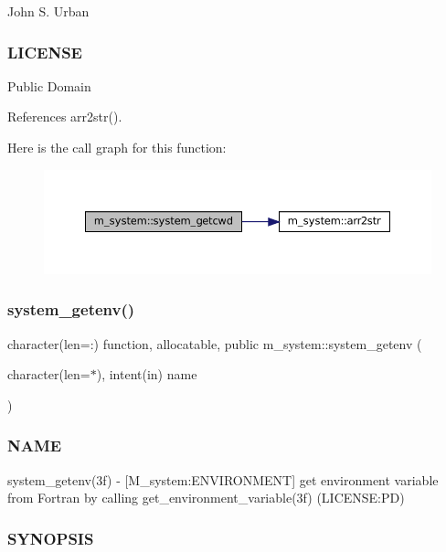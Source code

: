 John S. Urban \subsubsection*{L\+I\+C\+E\+N\+SE}

Public Domain 

References arr2str().

Here is the call graph for this function\+:
\nopagebreak
\begin{figure}[H]
\begin{center}
\leavevmode
\includegraphics[width=350pt]{namespacem__system_a5a32db818a9ffb0a4ea724e95356c560_cgraph}
\end{center}
\end{figure}
\mbox{\label{namespacem__system_a15f307db605f8b332d4213814c0fb1a9}} 
\subsubsection{\texorpdfstring{system\+\_\+getenv()}{system\_getenv()}}
{\footnotesize\ttfamily character(len=\+:) function, allocatable, public m\+\_\+system\+::system\+\_\+getenv (\begin{DoxyParamCaption}\item[{character(len=$\ast$), intent(in)}]{name }\end{DoxyParamCaption})}



\subsubsection*{N\+A\+ME}

system\+\_\+getenv(3f) -\/ \mbox{[}M\+\_\+system\+:E\+N\+V\+I\+R\+O\+N\+M\+E\+NT\mbox{]} get environment variable from Fortran by calling get\+\_\+environment\+\_\+variable(3f) (L\+I\+C\+E\+N\+SE\+:PD) 

\subsubsection*{S\+Y\+N\+O\+P\+S\+IS}

